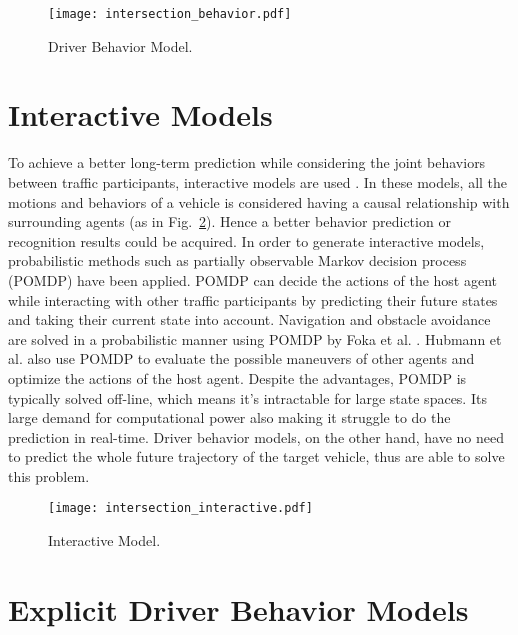 \newpage

\begin{figure}[htbp]
\begin{center}
\texttt{[image: intersection\_behavior.pdf]}
\end{center}
\caption{Driver Behavior Model.}
\label{driver_behavior} 
\end{figure}


\section{Interactive Models}
\label{Literature:Interactive}
To achieve a better long-term prediction while considering the joint behaviors between traffic participants, interactive models are used . In these models, all the motions and behaviors of a vehicle is considered having a causal relationship with surrounding agents (as in Fig.~\ref{interactive}). Hence a better behavior prediction or recognition results could be acquired. In order to generate interactive models, probabilistic methods such as partially observable Markov decision process (POMDP) have been applied.  POMDP can decide the actions of the host agent while interacting with other traffic participants by predicting their future states and taking their current state into account. Navigation and obstacle avoidance are solved in a probabilistic manner using POMDP by Foka et al. \cite{Foka}. Hubmann et al. \cite{state_uncertain_environment} also use POMDP to evaluate the possible maneuvers of other agents and optimize the actions of the host agent. Despite the advantages, POMDP is typically solved off-line, which means it's intractable for large state spaces. Its large demand for computational power also making it struggle to do the  prediction in real-time. Driver behavior models, on the other hand, have no need to predict the whole future trajectory of the target vehicle, thus are able to solve this problem. 


\begin{figure}[htbp]
\begin{center}
\texttt{[image: intersection\_interactive.pdf]}
\end{center}
\caption{Interactive Model.}
\label{interactive} 
\end{figure}



\section{Explicit Driver Behavior Models}


